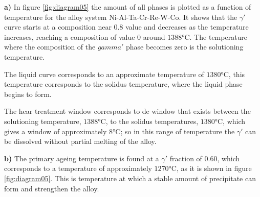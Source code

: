 \newpage
\textbf{a)} In  figure \ref{fig:diagram05} the amount of all phases is plotted as a function of temperature for the alloy system Ni-Al-Ta-Cr-Re-W-Co. It shows that the $\gamma'$ curve starts at a composition near $0.8$ value and decreases as the temperature increases, reaching a composition of value $0$ around $1388$°C. The temperature where the composition of the $gamma'$ phase becomes zero is the solutioning temperature. 

The liquid curve corresponds to an approximate temperature of $1380$°C, this temperature corresponds to the solidus temperature, where the liquid phase begins to form. 

The hear treatment window corresponds to de window that exists between the solutioning temperature, $1388$°C, to the solidus temperatures, $1380$°C, which gives a window of approximately $8$°C; so in this range of temperature the $\gamma'$ can be dissolved without partial melting of the alloy.

\textbf{b)} The primary ageing temperature is found at a $\gamma'$ fraction of 0.60, which corresponds to a temperature of approximately $1270$°C, as it is shown in figure \ref{fig:diagram05}. This is temperature at which a stable amount of precipitate can form and strengthen the alloy.